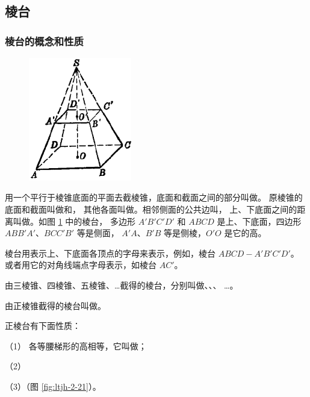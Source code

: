 \subsection{棱台}\label{subsec:2-3}

\begin{enhancedline}

\subsubsection{棱台的概念和性质}

\begin{figure}
    \centering
    \includegraphics[width=4.5cm]{../pic/ltjh-ch2-20.png}
    \caption{}\label{fig:ltjh-2-20}
\end{figure}

用一个平行于棱锥底面的平面去截棱锥，底面和截面之间的部分叫做。
原棱锥的底面和截面叫做和，
其他各面叫做。相邻侧面的公共边叫，
上、下底面之间的距离叫做。如图 \ref{fig:ltjh-2-20} 中的棱台，
多边形 $A'B'C'D'$ 和 $ABCD$ 是上、下底面，四边形 $ABB'A'$、$BCC'B'$ 等是侧面，
$A'A$、$B'B$ 等是侧棱，$O'O$ 是它的高。

棱台用表示上、下底面各顶点的字母来表示，例如，棱台 $ABCD{-}A'B'C'D'$。
或者用它的对角线端点字母表示，如棱台 $AC'$。

由三棱锥、四棱锥、五棱锥、…截得的棱台，分别叫做、、、 …。


由正棱锥截得的棱台叫做。

正棱台有下面性质：

（1） 各等腰梯形的高相等，它叫做；

（2）

（3）（图 \ref{fig:ltjh-2-21}）。


\end{enhancedline}
